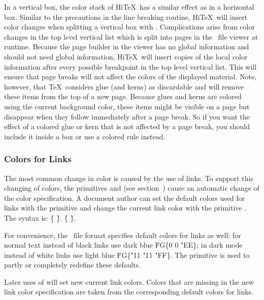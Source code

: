 In a vertical box, the color stack of Hi\TeX\ has a similar effect as in
a horizontal box. Similar to the precautions in the line breaking routine,
Hi\TeX\ will insert color changes when splitting a vertical box with .
Complications arise from color changes in the top level vertical list
which is split into pages in the \HINT\ file viewer at runtime.
Because the page builder in the viewer has no global information and
should not need global information, Hi\TeX\ will insert copies of the
local color information after every possible breakpoint in the top
level vertical list. This will ensure that page breaks will not
affect the colors of the displayed material.
Note, however, that \TeX\ considers glue (and kerns) as discardable
and will remove these items from the top of a new page. Because glues and kerns
are colored using the current background color, these items might be visible
on a page but disappear when they follow immediately after a page break.
So if you want the effect of a colored glue or kern that is not affected by
a page break, you should include it inside a box or use a colored rule instead.

\subsubsection{Colors for Links}
The most common change in color is caused by the use of links.
To support this changing of colors, the primitives
and 
(see section~)
cause an automatic change of the color specification.
A document author can set the default colors used for links
with the  primitive  and change
the current link color with the primitive .
The syntax is:
\medskip
\prim{} \.{\{}  \.{\}}.
\prim{} \.{\{}  \.{\}}.
\medskip

For convenience, the \HINT\ file format specifies default colors
for links as well: for normal text instead of black links use
dark blue \.{FG\{0 0 "EE\}};  in dark mode instead of white
links use light blue \.{FG\{"11 "11 "FF\}}.
The primitive  is used
to partly or completely redefine these defaults.

Later uses of  will set new current link colors.
Colors that are missing in the new link color specification are taken
from the corresponding default colors for links.

